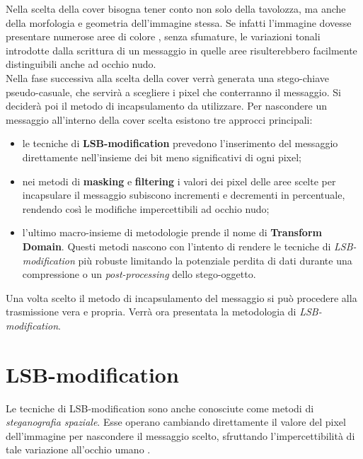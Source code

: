 Nella scelta della cover bisogna tener conto non solo della tavolozza, ma anche della morfologia e geometria dell'immagine stessa. Se infatti l'immagine dovesse presentare numerose aree di colore , senza sfumature, le variazioni tonali introdotte dalla scrittura di un messaggio in quelle aree risulterebbero facilmente distinguibili anche ad occhio nudo.\\Nella fase successiva alla scelta della cover verrà generata una stego-chiave pseudo-casuale, che servirà a scegliere i pixel che conterranno il messaggio. Si deciderà poi il metodo di incapsulamento da utilizzare. Per nascondere un messaggio all'interno della cover scelta esistono tre approcci principali:
\begin{itemize}
\item le tecniche di \textbf{LSB-modification} prevedono l'inserimento del messaggio direttamente nell'insieme dei bit meno significativi di ogni pixel;
\item nei metodi di \textbf{masking} e \textbf{filtering} i valori dei pixel delle aree scelte per incapsulare il messaggio subiscono incrementi e decrementi in percentuale, rendendo così le modifiche impercettibili ad occhio nudo;
\item l'ultimo macro-insieme di metodologie prende il nome di \textbf{Transform Domain}. Questi metodi nascono con l'intento di rendere le tecniche di \textit{LSB-modification} più robuste \cite{seeingTheUnseen} limitando la potenziale perdita di dati durante una compressione o un \textit{post-processing} dello stego-oggetto.
\end{itemize}
Una volta scelto il metodo di incapsulamento del messaggio si può procedere alla trasmissione vera e propria.
Verrà ora presentata la metodologia di \textit{LSB-modification}.
		\section{LSB-modification}
Le tecniche di LSB-modification sono anche conosciute come metodi di \textit{steganografia spaziale}. Esse operano cambiando direttamente il valore del pixel dell'immagine per nascondere il messaggio scelto, sfruttando l'impercettibilità di tale variazione all'occhio umano \cite{warfare}.

